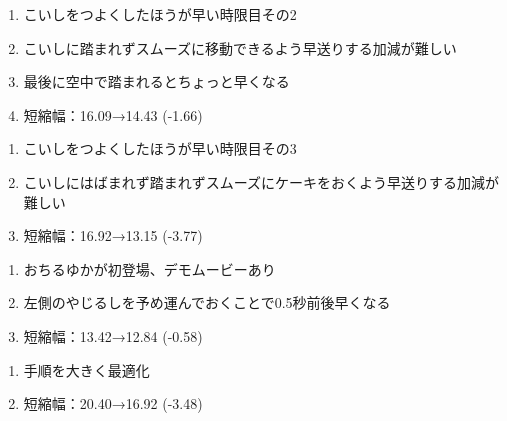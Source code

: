 \begin{enumerate}[label={\sarrow}]
\item こいしをつよくしたほうが早い時限目その2
\item こいしに踏まれずスムーズに移動できるよう早送りする加減が難しい
\item 最後に空中で踏まれるとちょっと早くなる
\item 短縮幅：16.09→14.43 (-1.66)
\end{enumerate}



\begin{enumerate}[label={\sarrow}]
\item こいしをつよくしたほうが早い時限目その3
\item こいしにはばまれず踏まれずスムーズにケーキをおくよう早送りする加減が難しい
\item 短縮幅：16.92→13.15 (-3.77)
\end{enumerate}



\begin{enumerate}[label={\sarrow}]
\item おちるゆかが初登場、デモムービーあり
\item 左側のやじるしを予め運んでおくことで0.5秒前後早くなる
\item 短縮幅：13.42→12.84 (-0.58)
\end{enumerate}



\begin{enumerate}[label={\sarrow}]
\item 手順を大きく最適化
\item 短縮幅：20.40→16.92 (-3.48)
\end{enumerate}



